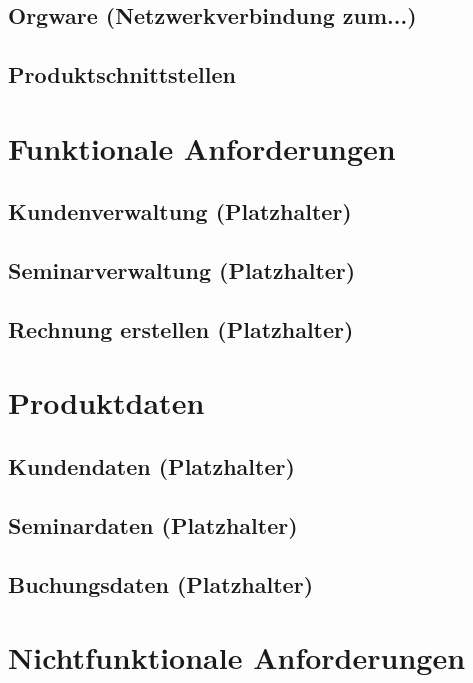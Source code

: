 \documentclass[11pt,a4paper]{article}
\begin{document}
\subsection{Orgware (Netzwerkverbindung zum...)}

\subsection{Produktschnittstellen}


\section{Funktionale Anforderungen}

\subsection{Kundenverwaltung (Platzhalter)}

\subsection{Seminarverwaltung (Platzhalter)}

\subsection{Rechnung erstellen (Platzhalter)}



\section{Produktdaten}

\subsection{Kundendaten (Platzhalter)}

\subsection{Seminardaten (Platzhalter)}

\subsection{Buchungsdaten (Platzhalter)}


\section{Nichtfunktionale Anforderungen}
\end{document}
